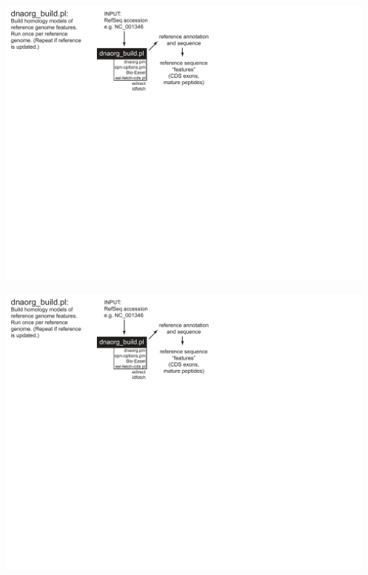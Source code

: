 \documentclass[landscape]{slides}
\begin{document}
\begin{slide}
\includegraphics[width=10in]{figs/dnaorg-scripts-build1}
\vfill
\end{slide}
\begin{slide}
\includegraphics[width=10in]{figs/dnaorg-scripts-build1}
\vfill
\end{slide}
\end{document}
